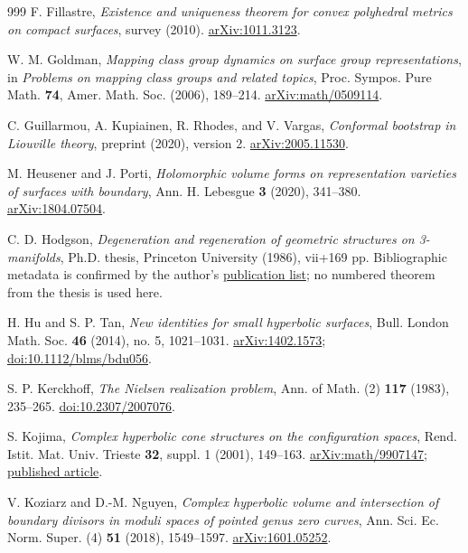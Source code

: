 \documentclass[11pt,a4paper]{article}
\numberwithin{equation}{section}
\theoremstyle{definition}
\theoremstyle{remark}
\begin{document}
\begin{thebibliography}{999}
F. Fillastre,
\emph{Existence and uniqueness theorem for convex polyhedral metrics on
compact surfaces}, survey (2010).
\href{https://arxiv.org/abs/1011.3123}{arXiv:1011.3123}.

W. M. Goldman,
\emph{Mapping class group dynamics on surface group representations},
in \emph{Problems on mapping class groups and related topics},
Proc. Sympos. Pure Math. \textbf{74}, Amer. Math. Soc. (2006), 189--214.
\href{https://arxiv.org/abs/math/0509114}{arXiv:math/0509114}.

C. Guillarmou, A. Kupiainen, R. Rhodes, and V. Vargas,
\emph{Conformal bootstrap in Liouville theory},
preprint (2020), version 2.
\href{https://arxiv.org/abs/2005.11530}{arXiv:2005.11530}.

M. Heusener and J. Porti,
\emph{Holomorphic volume forms on representation varieties of surfaces
with boundary}, Ann. H. Lebesgue \textbf{3} (2020), 341--380.
\href{https://arxiv.org/abs/1804.07504}{arXiv:1804.07504}.

C. D. Hodgson,
\emph{Degeneration and regeneration of geometric structures on 3-manifolds},
Ph.D. thesis, Princeton University (1986), vii+169 pp.
Bibliographic metadata is confirmed by the author's
\href{https://researchers.ms.unimelb.edu.au/~craigdh@unimelb/public.html}{publication list};
no numbered theorem from the thesis is used here.

H. Hu and S. P. Tan,
\emph{New identities for small hyperbolic surfaces},
Bull. London Math. Soc. \textbf{46} (2014), no. 5, 1021--1031.
\href{https://arxiv.org/abs/1402.1573}{arXiv:1402.1573};
\href{https://doi.org/10.1112/blms/bdu056}{doi:10.1112/blms/bdu056}.

S. P. Kerckhoff,
\emph{The Nielsen realization problem},
Ann. of Math. (2) \textbf{117} (1983), 235--265.
\href{https://doi.org/10.2307/2007076}{doi:10.2307/2007076}.

S. Kojima,
\emph{Complex hyperbolic cone structures on the configuration spaces},
Rend. Istit. Mat. Univ. Trieste \textbf{32}, suppl. 1 (2001), 149--163.
\href{https://arxiv.org/abs/math/9907147}{arXiv:math/9907147};
\href{https://rendiconti.dmi.units.it/volumi/32s1/09.pdf}{published article}.

V. Koziarz and D.-M. Nguyen,
\emph{Complex hyperbolic volume and intersection of boundary divisors in
moduli spaces of pointed genus zero curves},
Ann. Sci. Ec. Norm. Super. (4) \textbf{51} (2018), 1549--1597.
\href{https://arxiv.org/abs/1601.05252}{arXiv:1601.05252}.


\end{thebibliography}
\end{document}
